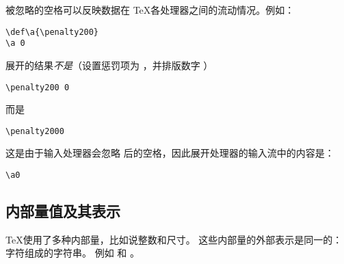 \documentclass{book}
\begin{document}
被忽略的空格可以反映数据在 \TeX 各处理器之间的流动情况。例如：
\begin{verbatim}
\def\a{\penalty200}
\a 0
\end{verbatim}
展开的结果\emph{不是}（设置惩罚项为 ，并排版数字 ）
\begin{verbatim}
\penalty200 0
\end{verbatim}
而是
\begin{verbatim}
\penalty2000
\end{verbatim}
这是由于输入处理器会忽略  后的空格，因此展开处理器的输入流中的内容是：
\begin{verbatim}
\a0
\end{verbatim}

\subsection{内部量值及其表示}

\TeX 使用了多种内部量，比如说整数和尺寸。
这些内部量的外部表示是同一的：字符组成的字符串。
例如  和 \n{91.44cm}。
\end{document}
